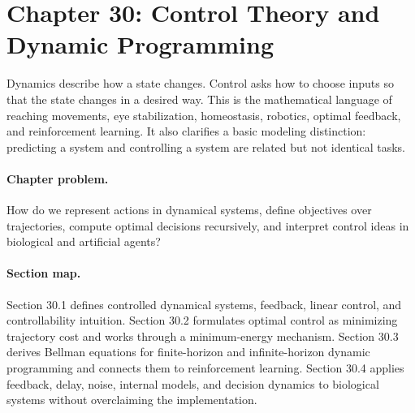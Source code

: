 \section{Chapter 30: Control Theory and Dynamic Programming}
\label{ch:control-theory-dynamic-programming}

Dynamics describe how a state changes. Control asks how to choose inputs so that the state changes in a desired way. This is the mathematical language of reaching movements, eye stabilization, homeostasis, robotics, optimal feedback, and reinforcement learning. It also clarifies a basic modeling distinction: predicting a system and controlling a system are related but not identical tasks.

\paragraph{Chapter problem.}
How do we represent actions in dynamical systems, define objectives over trajectories, compute optimal decisions recursively, and interpret control ideas in biological and artificial agents?

\paragraph{Section map.}
Section 30.1 defines controlled dynamical systems, feedback, linear control, and controllability intuition. Section 30.2 formulates optimal control as minimizing trajectory cost and works through a minimum-energy mechanism. Section 30.3 derives Bellman equations for finite-horizon and infinite-horizon dynamic programming and connects them to reinforcement learning. Section 30.4 applies feedback, delay, noise, internal models, and decision dynamics to biological systems without overclaiming the implementation.

